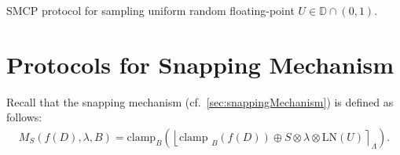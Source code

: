                   \begin{protocol}[tbh!]
                        \centering
                        \caption{SMCP protocol for sampling uniform random floating-point $U\in \mathbb{D} \cap \left(0,1\right) $.}
                        \label{prot:RandFloat1}
                  \end{protocol}
                  \FloatBarrier


                  \section{\smpc Protocols for Snapping Mechanism}
                  \label{sec:MPCProtocolsforSnappingMechanism}

                  Recall that the snapping mechanism (cf.~\autoref{sec:snappingMechanism}) is defined as follows:
                  \begin{equation}
                        \begin{split}
                              M_{S}\left(f\left(D\right),\lambda,B\right) =\text{clamp}_{B}\left(\left\lfloor\text {clamp }_{B}\left(f\left(D\right) \right) \oplus S\otimes \lambda\otimes \text{LN}\left(U\right) \right\rceil_{\Lambda}\right).
                        \end{split}
                  \end{equation}

